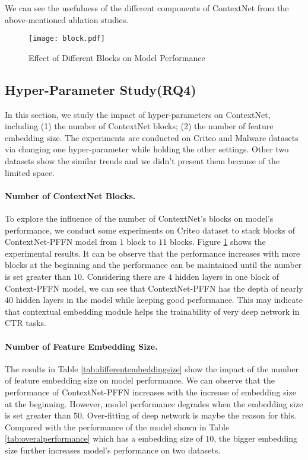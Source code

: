 \documentclass[sigconf]{acmart}
\begin{document}
We can see the usefulness of the different components of ContextNet from the above-mentioned ablation studies.


\begin{figure}
  \setlength{\abovecaptionskip}{0pt}
  \centering
  \texttt{[image: block.pdf]}
  \caption{Effect of Different Blocks on Model Performance}
  \label{fig:blocks}
\end{figure}


\subsection{Hyper-Parameter Study(RQ4)}

In this section, we study the impact of hyper-parameters on ContextNet, including (1) the number of ContextNet blocks; (2) the number of feature embedding size. The experiments are conducted on Criteo and Malware datasets via changing one hyper-parameter while holding the other settings. Other two datasets show the similar trends and we didn't present them because of the limited space.


\paragraph{\textbf{Number of ContextNet Blocks.}}   To explore the influence of the number of ContextNet's blocks on model's performance, we conduct some experiments on Criteo dataset to stack blocks of ContextNet-PFFN model from $1$ block to $11$ blocks. Figure \ref{fig:blocks} shows the experimental results. It can be observe that the performance increases with more blocks at the beginning and  the performance can be maintained until the number is set greater than $10$. Considering there are $4$ hidden layers in one block of Context-PFFN model, we can see that ContextNet-PFFN has the depth of nearly $40$ hidden layers in the model while keeping good performance. This may indicate that contextual embedding module helps the trainability of very deep network in CTR tasks.


\paragraph{\textbf{Number of Feature Embedding Size.}} The results in Table \ref{tab:differentembeddingsize} show the impact of the number of feature embedding size on model performance. We can observe that the performance of ContextNet-PFFN increases with the increase of embedding size at the beginning. However, model performance degrades when the embedding size is set greater than $50$. Over-fitting of deep network is maybe the reason for this. Compared with the performance of  the model  shown in Table \ref{tab:overalperformance} which has a embedding size of $10$, the bigger embedding size further increases model's performance on two datasets.
\end{document}
